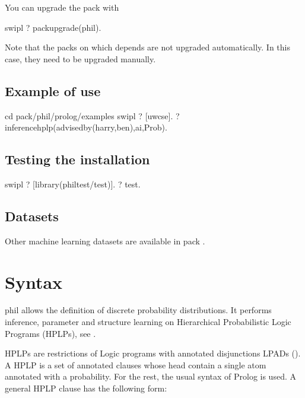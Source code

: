 \documentclass[letterpaper,10pt,english]{sphinxmanual}
\begin{document}
You can upgrade the pack with

\begin{sphinxVerbatim}[commandchars=\\\{\}]
\PYGZdl{} swipl
?\PYGZhy{} pack\PYGZus{}upgrade(phil).
\end{sphinxVerbatim}

Note that the packs on which  depends are not upgraded automatically. In this case, they need to be upgraded manually.


\section{Example of use}
\label{\detokenize{index:example-of-use}}
\begin{sphinxVerbatim}[commandchars=\\\{\}]
\PYGZdl{} cd \PYGZlt{}pack\PYGZgt{}/phil/prolog/examples
\PYGZdl{} swipl
?\PYGZhy{} [uwcse].
?\PYGZhy{} inference\PYGZus{}hplp(advisedby(harry,ben),ai,Prob).
\end{sphinxVerbatim}


\section{Testing the installation}
\label{\detokenize{index:testing-the-installation}}
\begin{sphinxVerbatim}[commandchars=\\\{\}]
\PYGZdl{} swipl
?\PYGZhy{} [library(phil\PYGZus{}test/test)].
?\PYGZhy{} test.
\end{sphinxVerbatim}


\section{Datasets}
\label{\detokenize{index:datasets}}
Other machine learning datasets are available in pack .


\chapter{Syntax}
\label{\detokenize{index:syntax}}
phil allows the definition of discrete probability distributions. It performs inference, parameter and structure learning on Hierarchical Probabilistic Logic Programs (HPLPs), see .

HPLPs are restrictions of Logic programs with annotated disjunctions LPADs (). A HPLP is a set of annotated clauses whose head contain a single atom annotated with a probability. For the rest, the usual syntax of Prolog is used.
A general HPLP clause has the following form:
\end{document}

